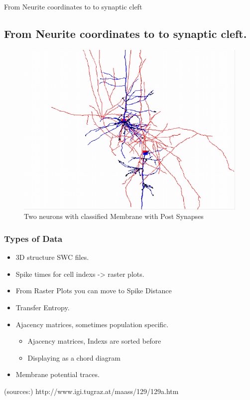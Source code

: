 \documentclass{beamer}
\begin{document}

\begin{frame}{From Neurite coordinates to  to synaptic cleft}
	\subsection{From Neurite coordinates to  to synaptic cleft.}
	
	
	\begin{figure} \caption{Two neurons with classified Membrane with Post Synapses} 
		\includegraphics[scale=0.5]{classify.png} \end{figure}
	
	
\end{frame}


\begin{frame}
	\frametitle{Types of Data}%
	\begin{itemize}
		
		\vfill\item 3D structure SWC files.
		\vfill \item Spike times for cell indexs -> raster plots.
		\vfill \item From Raster Plots you can move to Spike Distance
		\vfill \item Transfer Entropy.
		\vfill \item Ajacency matrices, sometimes population specific.
			\begin{itemize}
				\vfill \item Ajacency matrices, Indexs are sorted before
				\vfill \item Displaying as a chord diagram
			\end{itemize}
		\vfill \item Membrane potential traces.	
\end{itemize}
\vfill
\fontsize{6pt}{6pt}\selectfont 
(sources:)
http://www.igi.tugraz.at/maass/129/129a.htm

\end{frame}
\end{document}
